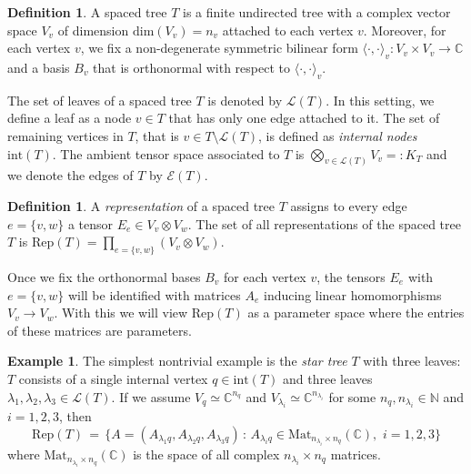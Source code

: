 \documentclass[12pt]{article}
\theoremstyle{definition}
\newtheorem{definition}[theorem]{Definition}
\newtheorem{example}[theorem]{Example}
\numberwithin{theorem}{section}
\newcommand{\CC}{\mathbb{C}}
\newcommand{\NN}{\mathbb{N}}
\begin{document}
\begin{definition}\cite[Definition 1.2.]{DK09}
A spaced tree $T$ is 
a finite undirected tree with a complex vector space $V_v$ of dimension $\mathrm{dim}(V_v) = n_v$ attached to each vertex $v$. Moreover, for each vertex $v$, we fix a non-degenerate symmetric bilinear form $\langle\cdot,\cdot \rangle_v: V_v \times V_v \rightarrow \CC$ and a basis $B_v$ that is orthonormal with respect to $\langle \cdot, \cdot \rangle_v$.
\end{definition}
The set of leaves of a spaced tree $T$ is denoted by $\mathcal{L}(T)$. In this setting, we define a leaf as a node $v\in T$ that has only one edge attached to it. The set of remaining vertices in $T$, that is $v\in T\setminus \mathcal{L}(T)$, is defined as \emph{internal nodes} $\mathrm{int}(T)$. The ambient tensor space associated to $T$ is $\bigotimes_{v \in \mathcal{L}(T)} V_v =: K_T$ and we denote the edges of $T$ by $\mathcal{E}(T)$. 
\begin{definition}\cite[Definition 1.4.]{DK09}
A \emph{representation} of a spaced tree $T$ assigns to every edge $e=\{v,w\}$ a tensor $E_e \in V_v \otimes V_w$. The set of all representations of the spaced tree $T$ is $\mathrm{Rep}(T)= \prod _{e=\{v,w\}} (V_v \otimes V_w)$. 
\end{definition}
Once we fix the orthonormal bases $B_v$ for each vertex $v$, the tensors $E_e$ with $e = \{v,w\}$ will be identified with matrices $A_e$ inducing linear homomorphisms $V_v \longrightarrow V_w$. With this we will view $\mathrm{Rep}(T)$ as a parameter space where the entries of these matrices are parameters. 

\begin{example} The simplest nontrivial example is the \emph{star tree} $T$ with three leaves: $T$ consists of a single internal vertex $q \in \mathrm{int}(T)$ and three leaves $\lambda_1, \lambda_2, \lambda_3 \in \mathcal{L}(T)$. If we assume $V_q \simeq \CC^{n_q}$
and $V_{\lambda_i} \simeq \CC^{n_{\lambda_i}}$ for some $n_q, n_{\lambda_i} \in \NN$ and $i=1,2,3$, 
then 
$$ \mathrm{Rep}(T) \, =\, \{A = (A_{\lambda_1 q}, A_{\lambda_2 q}, A_{\lambda_3 q}) \, : \, A_{\lambda_i q} \in \mathrm{Mat}_{ n_{\lambda_i} \times n_q}(\CC), \,\, i=1,2,3 \} $$
where $\mathrm{Mat}_{ n_{\lambda_i} \times n_q}(\CC)$ is the space of all complex $n_{\lambda_i} \times n_q$ matrices. 
\end{example}
\end{document}
